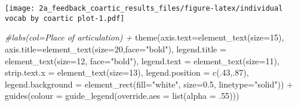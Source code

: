 \documentclass[
]{article}
\newenvironment{Shaded}{\begin{snugshade}}{\end{snugshade}}
\newcommand{\AttributeTok}[1]{\textcolor[rgb]{0.77,0.63,0.00}{#1}}
\newcommand{\CommentTok}[1]{\textcolor[rgb]{0.56,0.35,0.01}{\textit{#1}}}
\newcommand{\DecValTok}[1]{\textcolor[rgb]{0.00,0.00,0.81}{#1}}
\newcommand{\FloatTok}[1]{\textcolor[rgb]{0.00,0.00,0.81}{#1}}
\newcommand{\FunctionTok}[1]{\textcolor[rgb]{0.00,0.00,0.00}{#1}}
\newcommand{\NormalTok}[1]{#1}
\newcommand{\SpecialCharTok}[1]{\textcolor[rgb]{0.00,0.00,0.00}{#1}}
\newcommand{\StringTok}[1]{\textcolor[rgb]{0.31,0.60,0.02}{#1}}
\begin{document}
\texttt{[image: 2a\_feedback\_coartic\_results\_files/figure-latex/individual vocab by coartic plot-1.pdf]}

\begin{Shaded}
\begin{Highlighting}[]
  \CommentTok{\#labs(col=\textquotesingle{}Place of articulation\textquotesingle{}) + }
  \FunctionTok{theme}\NormalTok{(}\AttributeTok{axis.text=}\FunctionTok{element\_text}\NormalTok{(}\AttributeTok{size=}\DecValTok{15}\NormalTok{),}
      \AttributeTok{axis.title=}\FunctionTok{element\_text}\NormalTok{(}\AttributeTok{size=}\DecValTok{20}\NormalTok{,}\AttributeTok{face=}\StringTok{"bold"}\NormalTok{),}
      \AttributeTok{legend.title =} \FunctionTok{element\_text}\NormalTok{(}\AttributeTok{size=}\DecValTok{12}\NormalTok{, }\AttributeTok{face=}\StringTok{"bold"}\NormalTok{), }
      \AttributeTok{legend.text =} \FunctionTok{element\_text}\NormalTok{(}\AttributeTok{size=}\DecValTok{11}\NormalTok{),}
      \AttributeTok{strip.text.x =} \FunctionTok{element\_text}\NormalTok{(}\AttributeTok{size=}\DecValTok{13}\NormalTok{),}
      \AttributeTok{legend.position =} \FunctionTok{c}\NormalTok{(.}\DecValTok{43}\NormalTok{,.}\DecValTok{87}\NormalTok{),}
      \AttributeTok{legend.background =} \FunctionTok{element\_rect}\NormalTok{(}\AttributeTok{fill=}\StringTok{"white"}\NormalTok{, }
                                       \AttributeTok{size=}\FloatTok{0.5}\NormalTok{, }\AttributeTok{linetype=}\StringTok{"solid"}\NormalTok{)) }\SpecialCharTok{+}
  \FunctionTok{guides}\NormalTok{(}\AttributeTok{colour =} \FunctionTok{guide\_legend}\NormalTok{(}\AttributeTok{override.aes =} \FunctionTok{list}\NormalTok{(}\AttributeTok{alpha =}\NormalTok{ .}\DecValTok{55}\NormalTok{)))}
\end{Highlighting}
\end{Shaded}
\end{document}
